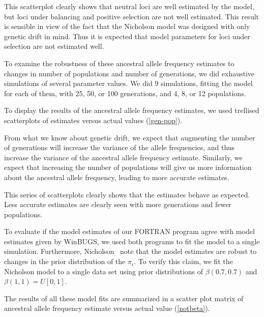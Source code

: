 \documentclass[a4paper,12pt]{article}
\begin{document}

This scatterplot clearly shows that neutral loci are well estimated by
the model, but loci under balancing and positive selection are not
well estimated. This result is sensible in view of the fact that the
Nicholson model was designed with only genetic drift in mind. Thus it
is expected that model parameters for loci under selection are not
estimated well.

To examine the robustness of these ancestral allele frequency
estimates to changes in number of populations and number of
generations, we did exhaustive simulations of several parameter
values. We did 9 simulations, fitting the model for each of them, with
25, 50, or 100 generations, and 4, 8, or 12 populations.

To display the results of the ancestral allele frequency estimates, we
used trellised scatterplots of estimates versus actual values
(\autoref{gen-pop}).


From what we know about genetic drift, we expect that augmenting the
number of generations will increase the variance of the allele
frequencies, and thus increase the variance of the ancestral allele
frequency estimate. Similarly, we expect that increasing the number of
populations will give us more information about the ancestral allele
frequency, leading to more accurate estimates.

This series of scatterplots clearly shows that the estimates behave as
expected. Less accurate estimates are clearly seen with more
generations and fewer populations.

To evaluate if the model estimates of our FORTRAN program agree with
model estimates given by WinBUGS, we used both programs to fit the
model to a single simulation. Furthermore, Nicholson \etal\ note that
the model estimates are robust to changes in the prior distribution of
the $\pi_i$. To verify this claim, we fit the Nicholson model to a
single data set using prior distributions of $\beta(0.7,0.7)$ and
$\beta(1,1)=U[0,1]$.

The results of all these model fits are summarized in a scatter plot
matrix of ancestral allele frequency estimate versus actual value
(\autoref{notbeta}).
\end{document}
